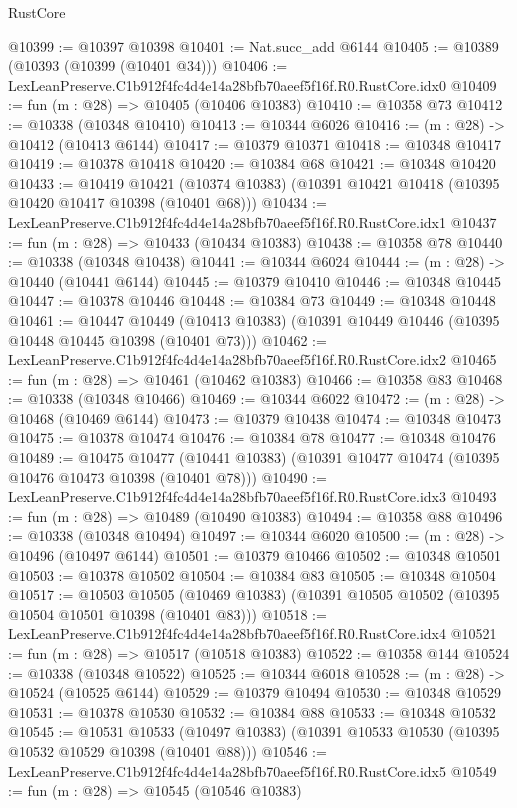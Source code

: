 \begin{lexlean}{RustCore}
\begin{coremodule}
@10399 := @10397 @10398
@10401 := Nat.succ_add @6144
@10405 := @10389 (@10393 (@10399 (@10401 @34)))
@10406 := LexLeanPreserve.C1b912f4fc4d4e14a28bfb70aeef5f16f.R0.RustCore.idx0
@10409 := fun (m : @28) => @10405 (@10406 @10383)
@10410 := @10358 @73
@10412 := @10338 (@10348 @10410)
@10413 := @10344 @6026
@10416 := (m : @28) -> @10412 (@10413 @6144)
@10417 := @10379 @10371
@10418 := @10348 @10417
@10419 := @10378 @10418
@10420 := @10384 @68
@10421 := @10348 @10420
@10433 := @10419
    @10421
    (@10374 @10383)
    (@10391 @10421 @10418 (@10395 @10420 @10417 @10398 (@10401 @68)))
@10434 := LexLeanPreserve.C1b912f4fc4d4e14a28bfb70aeef5f16f.R0.RustCore.idx1
@10437 := fun (m : @28) => @10433 (@10434 @10383)
@10438 := @10358 @78
@10440 := @10338 (@10348 @10438)
@10441 := @10344 @6024
@10444 := (m : @28) -> @10440 (@10441 @6144)
@10445 := @10379 @10410
@10446 := @10348 @10445
@10447 := @10378 @10446
@10448 := @10384 @73
@10449 := @10348 @10448
@10461 := @10447
    @10449
    (@10413 @10383)
    (@10391 @10449 @10446 (@10395 @10448 @10445 @10398 (@10401 @73)))
@10462 := LexLeanPreserve.C1b912f4fc4d4e14a28bfb70aeef5f16f.R0.RustCore.idx2
@10465 := fun (m : @28) => @10461 (@10462 @10383)
@10466 := @10358 @83
@10468 := @10338 (@10348 @10466)
@10469 := @10344 @6022
@10472 := (m : @28) -> @10468 (@10469 @6144)
@10473 := @10379 @10438
@10474 := @10348 @10473
@10475 := @10378 @10474
@10476 := @10384 @78
@10477 := @10348 @10476
@10489 := @10475
    @10477
    (@10441 @10383)
    (@10391 @10477 @10474 (@10395 @10476 @10473 @10398 (@10401 @78)))
@10490 := LexLeanPreserve.C1b912f4fc4d4e14a28bfb70aeef5f16f.R0.RustCore.idx3
@10493 := fun (m : @28) => @10489 (@10490 @10383)
@10494 := @10358 @88
@10496 := @10338 (@10348 @10494)
@10497 := @10344 @6020
@10500 := (m : @28) -> @10496 (@10497 @6144)
@10501 := @10379 @10466
@10502 := @10348 @10501
@10503 := @10378 @10502
@10504 := @10384 @83
@10505 := @10348 @10504
@10517 := @10503
    @10505
    (@10469 @10383)
    (@10391 @10505 @10502 (@10395 @10504 @10501 @10398 (@10401 @83)))
@10518 := LexLeanPreserve.C1b912f4fc4d4e14a28bfb70aeef5f16f.R0.RustCore.idx4
@10521 := fun (m : @28) => @10517 (@10518 @10383)
@10522 := @10358 @144
@10524 := @10338 (@10348 @10522)
@10525 := @10344 @6018
@10528 := (m : @28) -> @10524 (@10525 @6144)
@10529 := @10379 @10494
@10530 := @10348 @10529
@10531 := @10378 @10530
@10532 := @10384 @88
@10533 := @10348 @10532
@10545 := @10531
    @10533
    (@10497 @10383)
    (@10391 @10533 @10530 (@10395 @10532 @10529 @10398 (@10401 @88)))
@10546 := LexLeanPreserve.C1b912f4fc4d4e14a28bfb70aeef5f16f.R0.RustCore.idx5
@10549 := fun (m : @28) => @10545 (@10546 @10383)

\end{coremodule}
\end{lexlean}
